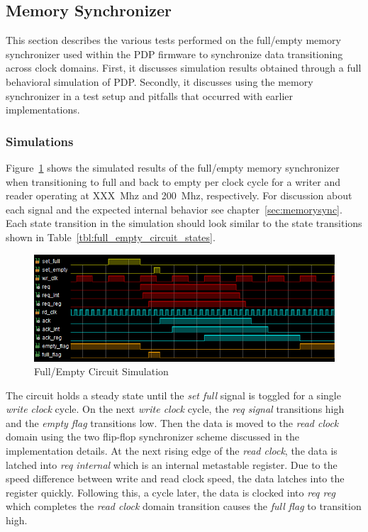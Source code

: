 
\label{chap:experimental_results}



\subsection{Memory Synchronizer}

This section describes the various tests performed on the full/empty memory synchronizer used within the PDP firmware to synchronize data transitioning across clock domains. First, it discusses simulation results obtained through a full behavioral simulation of PDP. Secondly, it discusses using the memory synchronizer in a test setup and pitfalls that occurred with earlier implementations.

\subsubsection{Simulations}
Figure~\ref{fig:full_empty_sim} shows the simulated results of the full/empty memory synchronizer when transitioning to full and back to empty per clock cycle for a writer and reader operating at \mbox{XXX Mhz} and \mbox{200 Mhz}, respectively. For discussion about each signal and the expected internal behavior see chapter~\ref{sec:memorysync}. Each state transition in the simulation should look similar to the state transitions shown in Table~\ref{tbl:full_empty_circuit_states}.

\begin{figure}
    \centering
    \includegraphics[width=1.0\textwidth]{fig/full_empty_sim.png}
    \caption{Full/Empty Circuit Simulation}
    \label{fig:full_empty_sim}
\end{figure}

The circuit holds a steady state until the {\it set full} signal is toggled for a single {\it write clock} cycle. On the next {\it write clock} cycle, the {\it req signal} transitions high and the {\it empty flag} transitions low. Then the data is moved to the {\it read clock} domain using the two flip-flop synchronizer scheme discussed in the implementation details. At the next rising edge of the {\it read clock}, the data is latched into {\it req internal} which is an internal metastable register. Due to the speed difference between write and read clock speed, the data latches into the register quickly. Following this, a cycle later, the data is clocked into {\it req reg} which completes the {\it read clock} domain transition causes the {\it full flag} to transition high.

